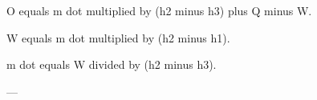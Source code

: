 O equals m dot multiplied by (h2 minus h3) plus Q minus W.  

W equals m dot multiplied by (h2 minus h1).  

m dot equals W divided by (h2 minus h3).  

---